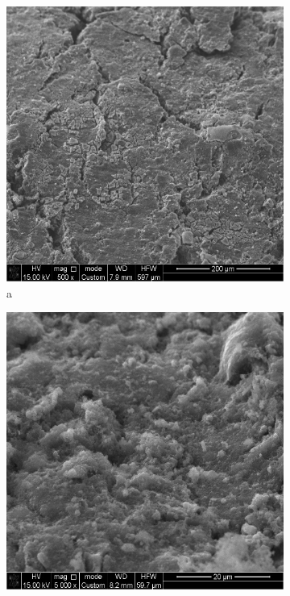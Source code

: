 \begin{figure}[H]
    \centering
    \begin{subfigure}[b]{0.32\textwidth}
        \centering
        \includegraphics[width=\textwidth,height=\textwidth]{media/chem2/image12}
        \caption*{a}
    \end{subfigure}
    \hfill
    \begin{subfigure}[b]{0.32\textwidth}
        \centering
        \includegraphics[width=\textwidth,height=\textwidth]{media/chem2/image13}

\end{subfigure}
\end{figure}
